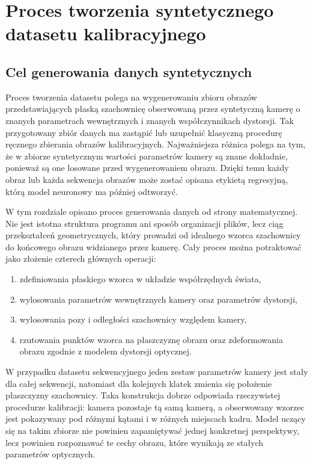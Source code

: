 \documentclass[12pt,a4paper]{report}
\begin{document}
\chapter{Proces tworzenia syntetycznego datasetu kalibracyjnego}
\label{chap:tworzenie-datasetu}

\section{Cel generowania danych syntetycznych}
Proces tworzenia datasetu polega na wygenerowaniu zbioru obrazów przedstawiających płaską
szachownicę obserwowaną przez syntetyczną kamerę o znanych parametrach wewnętrznych i znanych
współczynnikach dystorsji. Tak przygotowany zbiór danych ma zastąpić lub uzupełnić klasyczną
procedurę ręcznego zbierania obrazów kalibracyjnych. Najważniejsza różnica polega na tym, że
w zbiorze syntetycznym wartości parametrów kamery są znane dokładnie, ponieważ są one losowane
przed wygenerowaniem obrazu. Dzięki temu każdy obraz lub każda sekwencja obrazów może zostać
opisana etykietą regresyjną, którą model neuronowy ma później odtworzyć.

W tym rozdziale opisano proces generowania danych od strony matematycznej. Nie jest istotna
struktura programu ani sposób organizacji plików, lecz ciąg przekształceń geometrycznych,
który prowadzi od idealnego wzorca szachownicy do końcowego obrazu widzianego przez kamerę.
Cały proces można potraktować jako złożenie czterech głównych operacji:
\begin{enumerate}
    \item zdefiniowania płaskiego wzorca w układzie współrzędnych świata,
    \item wylosowania parametrów wewnętrznych kamery oraz parametrów dystorsji,
    \item wylosowania pozy i odległości szachownicy względem kamery,
    \item rzutowania punktów wzorca na płaszczyznę obrazu oraz zdeformowania obrazu zgodnie
          z modelem dystorsji optycznej.
\end{enumerate}

W przypadku datasetu sekwencyjnego jeden zestaw parametrów kamery jest stały dla całej
sekwencji, natomiast dla kolejnych klatek zmienia się położenie płaszczyzny szachownicy.
Taka konstrukcja dobrze odpowiada rzeczywistej procedurze kalibracji: kamera pozostaje tą
samą kamerą, a obserwowany wzorzec jest pokazywany pod różnymi kątami i w różnych miejscach
kadru. Model uczący się na takim zbiorze nie powinien zapamiętywać jednej konkretnej
perspektywy, lecz powinien rozpoznawać te cechy obrazu, które wynikają ze stałych parametrów
optycznych.
\end{document}
